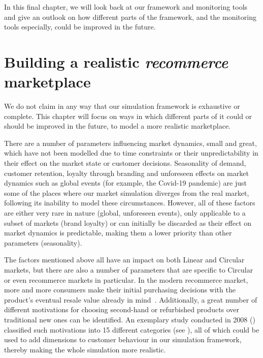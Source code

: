 \label{ch:Conclusions}

\begin{jointwork}
	In this final chapter, we will look back at our framework and monitoring tools and give an outlook on how different parts of the framework, and the monitoring tools especially, could be improved in the future.
\end{jointwork}

\section{Building a realistic \emph{recommerce} marketplace}\label{sec:DivergingFromRealMarket}

We do not claim in any way that our simulation framework is exhaustive or complete. This chapter will focus on ways in which different parts of it could or should be improved in the future, to model a more realistic marketplace.

There are a number of parameters influencing market dynamics, small and great, which have not been modelled due to time constraints or their unpredictability in their effect on the market state or customer decisions. Seasonality of demand, customer retention, loyalty through branding and unforeseen effects on market dynamics such as global events (for example, the Covid-19 pandemic) are just some of the places where our market simulation diverges from the real market, following its inability to model these circumstances. However, all of these factors are either very rare in nature (global, unforeseen events), only applicable to a subset of markets (brand loyalty) or can initially be discarded as their effect on market dynamics is predictable, making them a lower priority than other parameters (seasonality).

The factors mentioned above all have an impact on both Linear and Circular markets, but there are also a number of parameters that are specific to Circular or even recommerce markets in particular. In the modern recommerce market, more and more consumers make their initial purchasing decisions with the product's eventual resale value already in mind~\cite{ShoppingResaleValue}. Additionally, a great number of different motivations for choosing second-hand or refurbished products over traditional new ones can be identified. An exemplary study conducted in 2008 (\cite{SecondHandMotives}) classified such motivations into 15 different categories (see ), all of which could be used to add dimensions to customer behaviour in our simulation framework, thereby making the whole simulation more realistic.

